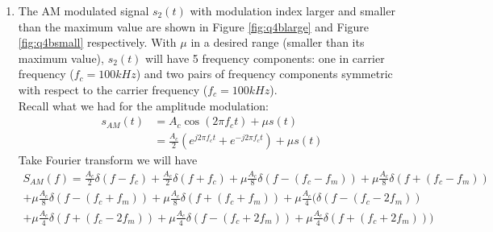\documentclass[11pt]{article}
\begin{document}
\begin{enumerate}[label=(\alph*)]
\item %
The AM modulated signal $s_2 (t)$ with modulation index larger and smaller than the maximum value are shown in Figure \ref{fig:q4blarge} and Figure \ref{fig:q4bsmall} respectively. With $\mu$ in a desired range (smaller than its maximum value), $s_2 (t)$ will have 5 frequency components: one in carrier frequency ($f_c=100kHz$) and two pairs of frequency components symmetric with respect to the carrier frequency ($f_c=100kHz$).\\
Recall what we had for the amplitude modulation:
\begin{align*}
    s_{AM}(t)& = A_c \cos(2\pi f_c t)+\mu s(t) \\
    &= \frac{A_c}{2} (e^{j2\pi f_c t}+e^{-j2\pi f_c t})+\mu s(t)
\end{align*}
Take Fourier transform we will have
\begin{align*}
    S_{AM}(f) = \frac{A_c}{2} \delta(f-f_c)+\frac{A_c}{2}\delta(f+f_c) +\mu\frac{A_c}{8} \delta (f-(f_c-f_m)) +\mu\frac{A_c}{8}\delta (f+(f_c-f_m)) \\ + \mu\frac{A_c}{8}\delta (f-(f_c+f_m)) + \mu\frac{A_c}{8}\delta (f+(f_c+f_m))
    +\mu\frac{A_c}{4} (\delta (f-(f_c-2f_m)) \\ +\mu\frac{A_c}{4}\delta (f+(f_c-2f_m)) +\mu\frac{A_c}{4}\delta (f-(f_c+2f_m)) +\mu\frac{A_c}{4}\delta (f+(f_c+2f_m)))
\end{align*}


\end{enumerate}
\end{document}
